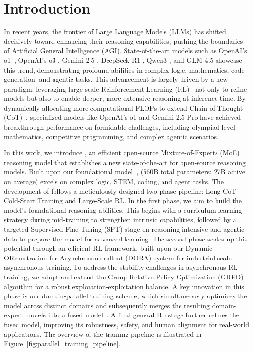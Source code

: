 \section{Introduction}
In recent years, the frontier of Large Language Models (LLMs) has shifted decisively toward enhancing their reasoning capabilities, pushing the boundaries of Artificial General Intelligence (AGI). 
State-of-the-art models such as OpenAI's o1~\citep{openai_o1}, OpenAI's o3 \citep{o3}, Gemini 2.5 \citep{comanici2025gemini}, DeepSeek-R1 \citep{guo2025deepseek}, Qwen3 \citep{yang2025qwen3}, and GLM-4.5 \citep{5team2025glm45agenticreasoningcoding} showcase this trend, demonstrating profound abilities in complex logic, mathematics, code generation, and agentic tasks. This advancement is largely driven by a new paradigm: leveraging large-scale Reinforcement Learning (RL)~\citep{sutton1998reinforcement} not only to refine models but also to enable deeper, more extensive reasoning at inference time. By dynamically allocating more computational FLOPs to extend Chain-of-Thought (CoT)~\citep{wei2022chain}, specialized models like OpenAI's o1 and Gemini 2.5 Pro have achieved breakthrough performance on formidable challenges, including olympiad-level mathematics, competitive programming, and complex agentic scenarios.

In this work, we introduce {\longcatthink}, an efficient open-source Mixture-of-Experts (MoE) reasoning model that establishes a new state-of-the-art for open-source reasoning models. Built upon our foundational {\longcatbase} model~\citep{meituan2025longcat_flash_chat}, {\longcatthink} ($560$B total parameters: 27B active on average) excels on complex logic, STEM, coding, and agent tasks. The development of {\longcatthink} follows a meticulously designed two-phase pipeline: Long CoT Cold-Start Training and Large-Scale RL. In the first phase, we aim to build the model's foundational reasoning abilities. This begins with a curriculum learning strategy during mid-training to strengthen intrinsic capabilities, followed by a targeted Supervised Fine-Tuning (SFT) stage on reasoning-intensive and agentic data to prepare the model for advanced learning. The second phase scales up this potential through an efficient RL framework, built upon our Dynamic ORchestration for Asynchronous rollout (DORA) system for industrial-scale asynchronous training. To address the stability challenges in asynchronous RL training, we adapt and extend the Group Relative Policy Optimization (GRPO)~\citep{grpo} algorithm for a robust exploration-exploitation balance. A key innovation in this phase is our domain-parallel training scheme, which simultaneously optimizes the model across distinct domains and subsequently merges the resulting domain-expert models into a fused model~\citep{yu2024language}. A final general RL stage further refines the fused model, improving its robustness, safety, and human alignment for real-world applications. The overview of the training pipeline is illustrated in Figure~\ref{fig:parallel_training_pipeline}.

